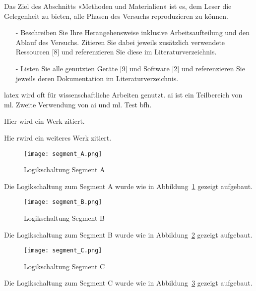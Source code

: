Das Ziel des Abschnitts «Methoden und Materialien» ist es, dem Leser die Gelegenheit zu bieten, alle Phasen des Versuchs reproduzieren zu können.

\begin{itemize}
    \item[-] Beschreiben Sie Ihre Herangehensweise inklusive Arbeitsaufteilung und den Ablauf des Versuchs. Zitieren Sie dabei jeweils zusätzlich verwendete Ressourcen [8] und referenzieren Sie diese im Literaturverzeichnis.
    \item[-] Listen Sie alle genutzten Geräte [9] und Software [2] und referenzieren Sie jeweils deren Dokumentation im Literaturverzeichnis.
\end{itemize}

\gls{latex} wird oft für wissenschaftliche Arbeiten genutzt. \gls{ai} ist ein Teilbereich von \gls{ml}. Zweite Verwendung von \gls{ai} und \gls{ml}. Test \gls{bfh}.


Hier wird ein Werk zitiert.\cite{EinsteinCoefficientsSpringerLink}

Hie rwird ein weiteres Werk zitiert.\cite{5GrundlagenFur2025}

\begin{figure}[H]
    \centering
    \texttt{[image: segment\_A.png]}
    \caption{Logikschaltung Segment A}
    \label{fig:segment_A}
\end{figure}

Die Logikschaltung zum Segment A wurde wie in Abbildung~\ref{fig:segment_A} gezeigt aufgebaut.

\begin{figure}[H]
    \centering
    \texttt{[image: segment\_B.png]}
    \caption{Logikschaltung Segment B}
    \label{fig:segment_B}
\end{figure}

Die Logikschaltung zum Segment B wurde wie in Abbildung~\ref{fig:segment_B} gezeigt aufgebaut.

\begin{figure}[H]
    \centering
    \texttt{[image: segment\_C.png]}
    \caption{Logikschaltung Segment C}
    \label{fig:segment_C}
\end{figure}

Die Logikschaltung zum Segment C wurde wie in Abbildung~\ref{fig:segment_C} gezeigt aufgebaut.

